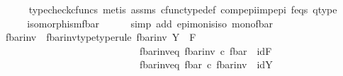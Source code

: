 \begin{isabellebody}
\ \ \ \ \isamarkupfalse%
\ {\isacharparenleft}{\kern0pt}typecheck{\isacharunderscore}{\kern0pt}cfuncs{\isacharcomma}{\kern0pt}\ metis\ assms{\isacharparenleft}{\kern0pt}{}{\isacharparenright}{\kern0pt}\ cfunc{\isacharunderscore}{\kern0pt}type{\isacharunderscore}{\kern0pt}def\ comp{\isacharunderscore}{\kern0pt}epi{\isacharunderscore}{\kern0pt}imp{\isacharunderscore}{\kern0pt}epi\ f{\isacharunderscore}{\kern0pt}eqs\ q{\isacharunderscore}{\kern0pt}type{\isacharparenright}{\kern0pt}\isanewline
\ \ \isanewline
\ \ \isamarkupfalse%
\ \isamarkupfalse%
\ {\isachardoublequoteopen}isomorphism{\isacharparenleft}{\kern0pt}f{\isacharunderscore}{\kern0pt}bar{\isacharparenright}{\kern0pt}{\isachardoublequoteclose}\isanewline
\ \ \ \ \isamarkupfalse%
\ {\isacharparenleft}{\kern0pt}simp\ add{\isacharcolon}{\kern0pt}\ epi{\isacharunderscore}{\kern0pt}mon{\isacharunderscore}{\kern0pt}is{\isacharunderscore}{\kern0pt}iso\ mono{\isacharunderscore}{\kern0pt}fbar{\isacharparenright}{\kern0pt}\isanewline
\isanewline
\ \ \isanewline
\ \ \isanewline
\isanewline
\ \ \isamarkupfalse%
\ f{\isacharunderscore}{\kern0pt}bar{\isacharunderscore}{\kern0pt}inv\ \ f{\isacharunderscore}{\kern0pt}bar{\isacharunderscore}{\kern0pt}inv{\isacharunderscore}{\kern0pt}type{\isacharbrackleft}{\kern0pt}type{\isacharunderscore}{\kern0pt}rule{\isacharbrackright}{\kern0pt}{\isacharcolon}{\kern0pt}\ {\isachardoublequoteopen}f{\isacharunderscore}{\kern0pt}bar{\isacharunderscore}{\kern0pt}inv{\isacharcolon}{\kern0pt}\ Y\ {\isasymrightarrow}\ F{\isachardoublequoteclose}\ \isanewline
\ \ \ \ \ \ \ \ \ \ \ \ \ \ \ \ \ \ \ \ \ \ \ \ \ \ \ \ f{\isacharunderscore}{\kern0pt}bar{\isacharunderscore}{\kern0pt}inv{\isacharunderscore}{\kern0pt}eq{}{\isacharcolon}{\kern0pt}\ {\isachardoublequoteopen}f{\isacharunderscore}{\kern0pt}bar{\isacharunderscore}{\kern0pt}inv\ {\isasymcirc}\isactrlsub c\ f{\isacharunderscore}{\kern0pt}bar\ {\isacharequal}{\kern0pt}\ id{\isacharparenleft}{\kern0pt}F{\isacharparenright}{\kern0pt}{\isachardoublequoteclose}\ \ \ \isanewline
\ \ \ \ \ \ \ \ \ \ \ \ \ \ \ \ \ \ \ \ \ \ \ \ \ \ \ \ f{\isacharunderscore}{\kern0pt}bar{\isacharunderscore}{\kern0pt}inv{\isacharunderscore}{\kern0pt}eq{}{\isacharcolon}{\kern0pt}\ {\isachardoublequoteopen}f{\isacharunderscore}{\kern0pt}bar\ {\isasymcirc}\isactrlsub c\ f{\isacharunderscore}{\kern0pt}bar{\isacharunderscore}{\kern0pt}inv\ {\isacharequal}{\kern0pt}\ id{\isacharparenleft}{\kern0pt}Y{\isacharparenright}{\kern0pt}{\isachardoublequoteclose}\isanewline

\end{isabellebody}
